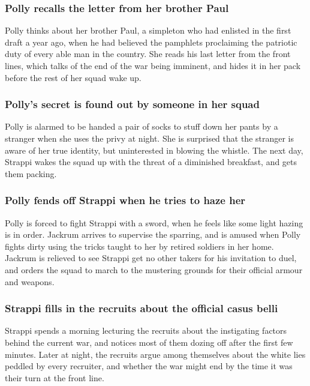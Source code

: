 \subsubsection{\Gls{Polly} recalls the letter from her brother \Gls{Paul}}
\Gls{Polly} thinks about her brother \Gls{Paul}, a simpleton who had enlisted in the first draft a
year ago, when he had believed the pamphlets proclaiming the patriotic duty of every able man in the
country. She reads his last letter from the front lines, which talks of the end of the war being
imminent, and hides it in her pack before the rest of her squad wake up.

\subsubsection{\Gls{Polly}'s secret is found out by someone in her squad}
\Gls{Polly} is alarmed to be handed a pair of socks to stuff down her pants by a stranger when she
uses the privy at night. She is surprised that the stranger is aware of her true identity, but
uninterested in blowing the whistle. The next day, \Gls{Strappi} wakes the squad up with the
threat of a diminished breakfast, and gets them packing.

\subsubsection{\Gls{Polly} fends off \Gls{Strappi} when he tries to haze her}
\Gls{Polly} is forced to fight \Gls{Strappi} with a sword, when he feels like some light hazing is
in order. \Gls{Jackrum} arrives to supervise the sparring, and is amused when \Gls{Polly} fights
dirty using the tricks taught to her by retired soldiers in her home. \Gls{Jackrum} is relieved to
see \Gls{Strappi} get no other takers for his invitation to duel, and orders the squad to march to
the mustering grounds for their official armour and weapons.

\subsubsection{\Gls{Strappi} fills in the recruits about the official casus belli}
\Gls{Strappi} spends a morning lecturing the recruits about the instigating factors behind the
current war, and notices most of them dozing off after the first few minutes. Later at night, the
recruits argue among themselves about the white lies peddled by every recruiter, and whether the
war might end by the time it was their turn at the front line.

